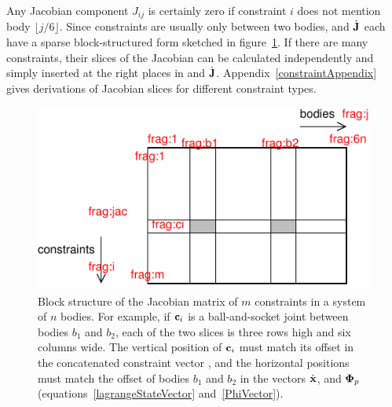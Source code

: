 Any Jacobian component $J_{ij}$ is certainly zero if constraint $i$ does not mention body
$\lfloor j/6 \rfloor$. Since constraints are usually only between two bodies,  and
$\dot{\m{J}}$ each have a sparse block-structured form sketched in figure~\ref{jacobianFigure}.
If there are many constraints, their slices of the Jacobian can be calculated independently and
simply inserted at the right places in  and $\dot{\m{J}}$. Appendix~\ref{constraintAppendix}
gives derivations of Jacobian slices for different constraint types.

\begin{figure}
\centerline{\includegraphics{figures/jacobian}}
\caption[]{Block structure of the Jacobian matrix of $m$ constraints in a system of $n$ bodies.
    For example, if $\ve{c}_i$ is a ball-and-socket joint between bodies $b_1$ and $b_2$, each of
    the two slices is three rows high and six columns wide. The vertical position of $\ve{c}_i$
    must match its offset in the concatenated constraint vector \hbox{}, and the horizontal
    positions must match the offset of bodies $b_1$ and $b_2$ in the vectors $\dot{\ve{x}}$,
    \ve{\Phi} and $\ve{\Phi}_p$ (equations~\ref{lagrangeStateVector} and~\ref{PhiVector}).
    \label{jacobianFigure}}
\end{figure}

